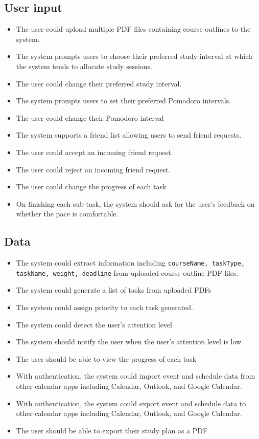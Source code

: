 \documentclass[12pt]{article}
\newcounter{reqnum} %
\newcommand{\rthereqnum}{FR\refstepcounter{reqnum}\thereqnum:}
\begin{document}
\subsection{User input}
\begin{itemize}
\item[\rthereqnum \label{R_upload_pdf}]
The user could upload multiple PDF files containing course outlines to the system.
\item[\rthereqnum]
The system prompts users to choose their preferred study interval at which the system tends to allocate study sessions.
\item[\rthereqnum]
The user could change their preferred study interval.
\item[\rthereqnum]
The system prompts users to set their preferred Pomodoro intervals. 
\item[\rthereqnum]
The user could change their Pomodoro interval
\item[\rthereqnum]
The system supports a friend list allowing users to send friend requests.
\item[\rthereqnum]
The user could accept an incoming friend request.
\item[\rthereqnum]
The user could reject an incoming friend request.
\item[\rthereqnum]
The user could change the progress of each task
\item[\rthereqnum]
On finishing each sub-task, the system should ask for the user's feedback on whether the pace is comfortable.
\end{itemize}

\subsection{Data}
\begin{itemize}
\item[\rthereqnum]
The system could extract information including \texttt{courseName, taskType, taskName, weight, deadline} from uploaded course outline PDF files.
\item[\rthereqnum]
The system could generate a list of tasks from uploaded PDFs 
\item[\rthereqnum \label{R_prioritize_task}]
The system could assign priority to each task generated.
\item[\rthereqnum]
The system could detect the user's attention level
\item[\rthereqnum]
The system should notify the user when the user's attention level is low
\item[\rthereqnum \label{R_check_task_progress}]
The user should be able to view the progress of each task
\item[\rthereqnum]
With authentication, the system could import event and schedule data from other calendar apps including Calendar, Outlook, and Google Calendar.
\item[\rthereqnum]
With authentication, the system could export event and schedule data to other calendar apps including Calendar, Outlook, and Google Calendar.
\item[\rthereqnum]
The user should be able to export their study plan as a PDF
\end{itemize}
\end{document}
